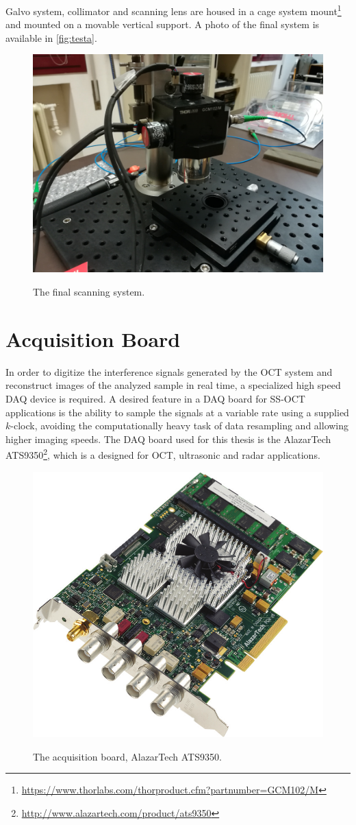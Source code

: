 Galvo system, collimator and scanning lens are housed in a cage system mount\footnote{\url{https://www.thorlabs.com/thorproduct.cfm?partnumber=GCM102/M}} and mounted on a movable vertical support. A photo of the final system is available in \autoref{fig:testa}.

\begin{figure}[bth]
	\myfloatalign
	{\includegraphics[width=0.6\linewidth]{gfx/ch3/testa}}
	\caption{The final scanning system.}\label{fig:testa}
\end{figure}
	
	\newpage
\section{Acquisition Board}
\label{sec:daq}	
	In order to digitize the interference signals generated by the OCT system and reconstruct images of the analyzed sample in real time, a specialized high speed \acf{DAQ} device is required. A desired feature in a \ac{DAQ} board for SS-OCT applications is the ability to sample the signals at a variable rate using a supplied $k$-clock, avoiding the computationally heavy task of data resampling and allowing higher imaging speeds. The \ac{DAQ} board used for this thesis is the AlazarTech ATS9350\footnote{\url{http://www.alazartech.com/product/ats9350}}, which is a designed for OCT, ultrasonic and radar applications. 
	
	
	\begin{figure}[bth]
		\myfloatalign
		{\includegraphics[width=.6\linewidth]{gfx/board}}
		\caption{The acquisition board, AlazarTech ATS9350.}\label{fig:acq-board}
	\end{figure}

